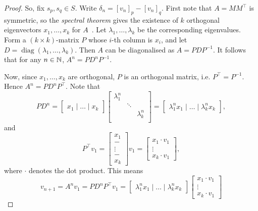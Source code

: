 \begin{proof}
    So, fix $s_p, s_q \in S$. Write $\delta_n = [v_n]_p - [v_n]_q$. First note
    that $A = MM^\top$ is symmetric, so the \emph{spectral theorem} gives the
    existence of $k$ orthogonal eigenvectors $x_1, \ldots, x_k$ for
    $A$~\cite[Theorem 7.29]{axler2014}. Let $\lambda_1, \ldots, \lambda_k$ be
    the corresponding eigenvalues. Form a $(k \times k)$-matrix $P$ whose
    $i$-th column is $x_i$, and let $D =
    \operatorname{diag}(\lambda_1,\ldots,\lambda_k)$. Then $A$ can be diagonalised as
    $A = PDP^{-1}$. It follows that for any $n \in \mathbb{N}$, $A^n = PD^nP^{-1}$.

    Now, since $x_1,\ldots,x_k$ are orthogonal, $P$ is an orthogonal matrix, i.e.
    $P^\top = P^{-1}$. Hence $A^n = PD^nP^\top$. Note that
    \[
        PD^n
        = \begin{bmatrix}
            x_1 \mid \ldots \mid x_k
        \end{bmatrix}
        \begin{bmatrix}
            \lambda_1^n &        &             \\
                        & \ddots &             \\
                        &        & \lambda_k^n \\
        \end{bmatrix}
        = \begin{bmatrix}
            \lambda_1^n x_1 \mid \ldots \mid \lambda_k^n x_k
        \end{bmatrix},
    \]
    and
    \[
        P^{\top}v_1
        = \begin{bmatrix}
            x_1 \\ - \\ \vdots \\ - \\ x_k
        \end{bmatrix} v_1
        = \begin{bmatrix}
            x_1 \cdot v_1 \\ \vdots \\ x_k \cdot v_1
        \end{bmatrix},
    \]
    where $\cdot$ denotes the dot product. This means
    \[
        v_{n+1}
        = A^nv_1
        = PD^nP^{\top}v_1
        = \begin{bmatrix}
            \lambda_1^n x_1 \mid \ldots \mid \lambda_k^n x_k
        \end{bmatrix}
        \begin{bmatrix}
            x_1 \cdot v_1 \\ \vdots \\ x_k \cdot v_1

\end{bmatrix}\]
\end{proof}
